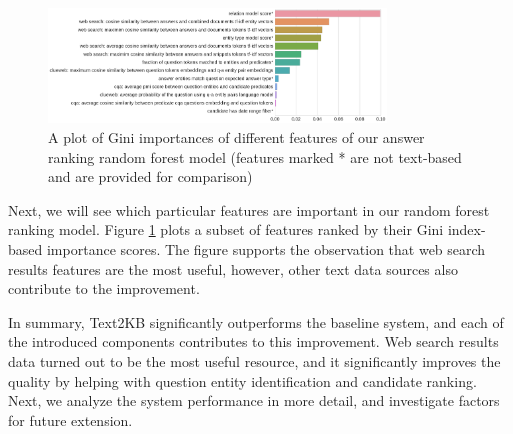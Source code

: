 \begin{figure}
\centering
\includegraphics[width=0.8\textwidth]{img/feature_importances}
\caption{A plot of Gini importances of different features of our answer ranking random forest model (features marked * are not text-based and are provided for comparison)}
\label{fig:feature_importances}
\end{figure}

Next, we will see which particular features are important in our random forest ranking model.
Figure \ref{fig:feature_importances} plots a subset of features ranked by their Gini index-based importance scores.
The figure supports the observation that web search results features are the most useful, however, other text data sources also contribute to the improvement.

In summary, Text2KB significantly outperforms the baseline system, and each of the introduced components contributes to this improvement.
Web search results data turned out to be the most useful resource, and it significantly improves the quality by helping with question entity identification and candidate ranking.
Next, we analyze the system performance in more detail, and investigate factors for future extension.